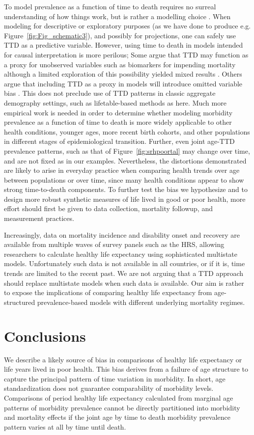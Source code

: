 \documentclass[12pt,oneside,a4paper]{article} %
\begin{document}
To model prevalence as a function of
time to death requires no surreal understanding of how things work, but is
rather a modelling choice \citep{wolf2015disability}. When modeling for
descriptive or exploratory purposes (as we have done to produce e.g. Figure~\ref{fig:Fig_schematic3}),
and possibly for projections, one can safely use
TTD as a predictive variable.
However, using time to death in models intended for causal interpretation is more perilous; Some argue that TTD may function as a proxy for unobserved variables such as biomarkers for impending mortality \citep{wolf2015disability} although a limited exploration of this possibility yielded mixed results \citep{rehkopf2016cross}. Others argue that including TTD as a proxy in models will introduce omitted variable bias \citep{lynch2015commentary}. This does not preclude use of TTD patterns in classic aggregate demography settings, such as lifetable-based methods as here. Much more empirical work is needed in order to determine whether modeling morbidity
prevalence as a function of time to death is more widely applicable to
other health conditions, younger ages, more recent birth
cohorts, and other populations in different stages of epidemiological
transition. Further, even joint age-TTD prevalence patterns, such as that of Figure~\ref{fig:srhpoortal} may change over time, and are not fixed as in our examples. Nevertheless, the distortions demonstrated are likely to arise in everyday practice when comparing health trends over age between populations or over time, since many health conditions appear to show strong time-to-death components. To further test the bias we hypothesize and to design more robust synthetic measures of life lived in good or poor health, more effort should first be given to data collection, mortality followup, and measurement practices.

Increasingly, data on mortality incidence and disability onset and recovery are available from
multiple waves of survey panels such as the HRS, allowing researchers to
calculate healthy life expectancy using sophisticated multistate models.
Unfortunately such data is not available in all countries, or if it is, time
trends are limited to the recent past. We are not arguing that a TTD approach
should replace multistate models when such data is available. Our aim is rather
to expose the implications of comparing healthy life expectancy from
age-structured prevalence-based models with different underlying mortality
regimes.

\section{Conclusions}
We describe a likely source of bias in comparisons of healthy life expectancy or life years lived in poor health. This bias derives from a failure of age structure to capture the principal pattern of time variation in morbidity. In short, age standardization does not guarantee comparability of morbidity levels. Comparisons of period healthy life expectancy calculated from marginal age patterns of morbidity prevalence cannot be directly partitioned into morbidity and mortality effects if the joint age by time to death morbidity prevalence pattern varies at all by time until death. 
\end{document}
